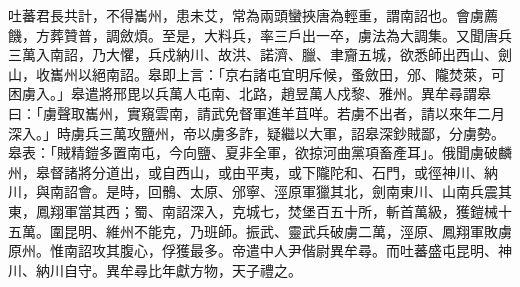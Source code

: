 \begin{pinyinscope}
 吐蕃君長共計，不得巂州，患未艾，常為兩頭蠻挾唐為輕重，謂南詔也。會虜薦饑，方葬贊普，調斂煩。至是，大料兵，率三戶出一卒，虜法為大調集。又聞唐兵三萬入南詔，乃大懼，兵戍納川、故洪、諾濟、臘、聿齎五城，欲悉師出西山、劍山，收巂州以絕南詔。皋即上言：「京右諸屯宜明斥候，蚤斂田，邠、隴焚萊，可困虜入。」皋遣將邢毘以兵萬人屯南、北路，趙昱萬人戍黎、雅州。異牟尋謂皋曰：「虜聲取巂州，實窺雲南，請武免督軍進羊苴咩。若虜不出者，請以來年二月深入。」時虜兵三萬攻鹽州，帝以虜多詐，疑繼以大軍，詔皋深鈔賊鄙，分虜勢。皋表：「賊精鎧多置南屯，今向鹽、夏非全軍，欲掠河曲黨項畜產耳」。俄聞虜破麟州，皋督諸將分道出，或自西山，或由平夷，或下隴陀和、石門，或徑神川、納川，與南詔會。是時，回鶻、太原、邠寧、涇原軍獵其北，劍南東川、山南兵震其東，鳳翔軍當其西；蜀、南詔深入，克城七，焚堡百五十所，斬首萬級，獲鎧械十五萬。圍昆明、維州不能克，乃班師。振武、靈武兵破虜二萬，涇原、鳳翔軍敗虜原州。惟南詔攻其腹心，俘獲最多。帝遣中人尹偕尉異牟尋。而吐蕃盛屯昆明、神川、納川自守。異牟尋比年獻方物，天子禮之。



\end{pinyinscope}